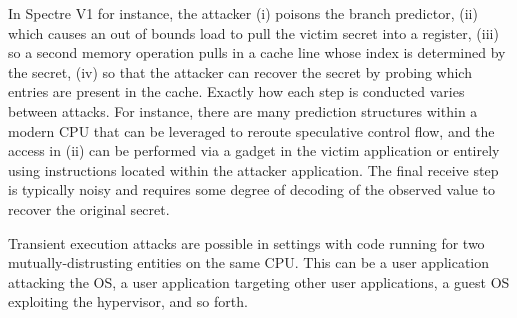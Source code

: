 In Spectre V1 for instance, the attacker (i) poisons the branch predictor, (ii) which causes an out of bounds load to pull the victim secret into a register, (iii) so a second memory operation pulls in a cache line whose index is determined by the secret, (iv) so that the attacker can recover the secret by probing which entries are present in the cache.
Exactly how each step is conducted varies between attacks.
For instance, there are many prediction structures within a modern CPU that can be leveraged to reroute speculative control flow, and the access in (ii) can be performed via a gadget in the victim application or entirely using instructions located within the attacker application.
The final receive step is typically noisy and requires some degree of decoding of the observed value to recover the original secret.

Transient execution attacks are possible in settings with code running for two mutually-distrusting entities on the same CPU.
This can be a user application attacking the OS, a user application targeting other user applications, a guest OS exploiting the hypervisor, and so forth.






